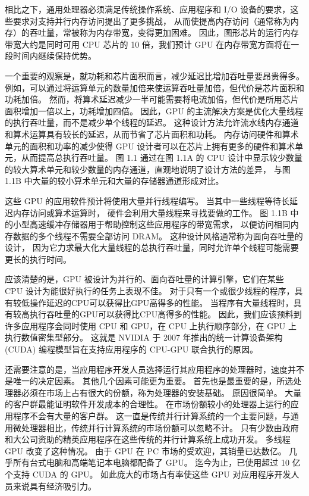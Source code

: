 相比之下，通用处理器必须满足传统操作系统、应用程序和 I/O 设备的要求，这些要求对支持并行内存访问提出了更多挑战，
从而使提高内存访问（通常称为内存）的吞吐量，常被称为内存带宽，变得更加困难。 
因此，图形芯片的运行内存带宽大约是同时可用 CPU 芯片的 10 倍，我们预计 GPU 在内存带宽方面将在一段时间内继续保持优势。

一个重要的观察是，就功耗和芯片面积而言，减少延迟比增加吞吐量要昂贵得多。 
例如，可以通过将运算单元的数量加倍来使运算吞吐量加倍，但代价是芯片面积和功耗加倍。 
然而，将算术延迟减少一半可能需要将电流加倍，但代价是所用芯片面积增加一倍以上，功耗增加四倍。 
因此，GPU 的主流解决方案是优化大量线程的执行吞吐量，而不是减少单个线程的延迟。 
这种设计方法允许流水线内存通道和算术运算具有较长的延迟，从而节省了芯片面积和功耗。 
内存访问硬件和算术单元的面积和功率的减少使得 GPU 设计者可以在芯片上拥有更多的硬件和算术单元，从而提高总执行吞吐量。 
图 1.1 通过在图 1.1A 的 CPU 设计中显示较少数量的较大算术单元和较少数量的内存通道，直观地说明了设计方法的差异，
与图 1.1B 中大量的较小算术单元和大量的存储器通道形成对比。

这些 GPU 的应用软件预计将使用大量并行线程编写。 当其中一些线程等待长延迟内存访问或算术运算时，
硬件会利用大量线程来寻找要做的工作。 图 1.1B 中的小型高速缓冲存储器用于帮助控制这些应用程序的带宽需求，
以便访问相同内存数据的多个线程不需要全部访问 DRAM。 这种设计风格通常称为面向吞吐量的设计，
因为它力求最大化大量线程的总执行吞吐量，同时允许单个线程可能需要更长的执行时间。

应该清楚的是，GPU 被设计为并行的、面向吞吐量的计算引擎，它们在某些 CPU 设计为能很好执行的任务上表现不佳。 
对于只有一个或很少线程的程序，具有较低操作延迟的CPU可以获得比GPU高得多的性能。 
当程序有大量线程时，具有较高执行吞吐量的GPU可以获得比CPU高得多的性能。 
因此，我们应该预料到许多应用程序会同时使用 CPU 和 GPU，在 CPU 上执行顺序部分，在 GPU 上执行数值密集型部分。 
这就是 NVIDIA 于 2007 年推出的统一计算设备架构 (CUDA) 编程模型旨在支持应用程序的 CPU-GPU 联合执行的原因。

还需要注意的是，当应用程序开发人员选择运行其应用程序的处理器时，速度并不是唯一的决定因素。 其他几个因素可能更为重要。 
首先也是最重要的是，所选处理器必须在市场上占有很大的份额，称为处理器的安装基础。 原因很简单。 
大量的客户群最能证明软件开发成本的合理性。 在市场份额较小的处理器上运行的应用程序不会有大量的客户群。 
这一直是传统并行计算系统的一个主要问题，与通用微处理器相比，传统并行计算系统的市场份额可以忽略不计。 
只有少数由政府和大公司资助的精英应用程序在这些传统的并行计算系统上成功开发。 多线程 GPU 改变了这种情况。 
由于 GPU 在 PC 市场的受欢迎，其销量已达数亿。 几乎所有台式电脑和高端笔记本电脑都配备了 GPU。 
迄今为止，已使用超过 10 亿个支持 CUDA 的 GPU。 如此庞大的市场占有率使这些 GPU 对应用程序开发人员来说具有经济吸引力。

